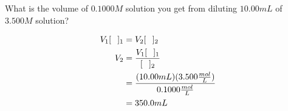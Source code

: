 \documentclass[11pt,addpoints]{exam}   	%
\begin{document}
\begin{questions}
\question[5] What is the volume of $0.1000 M$ solution you get from diluting $10.00 mL$ of $3.500 M$ solution?

\begin{solution}
\begin{equation} 
\begin{split}
   V_1 [ \hspace{0.1 in}]_1 &= V_2 [ \hspace{0.1 in}]_2 \\
   V_2 &= \frac{V_1 [ \hspace{0.1 in}]_1} {[\hspace{0.1 in} ]_2} \\
          &= \frac{(10.00 mL) (3.500 \frac{mol}{L}) } {0.1000 \frac{mol}{L}} \\
          &= 350.0 mL
 \end{split}
 \end{equation}
\end{solution}



\end{questions}

\pagebreak
\end{document}
